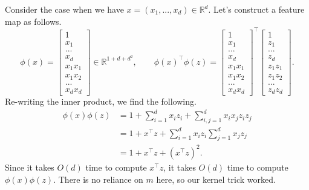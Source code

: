 
\begin{example}
Consider the case when we have $x = (x_1, ..., x_d) \in \mathbb{R}^d$. Let's construct a feature map as follows.
$$
\phi(x) = \begin{bmatrix} 1 \\ x_1 \\ ... \\ x_d \\ x_1x_1 \\ x_1x_2 \\ ... \\ x_dx_d \end{bmatrix} \in \mathbb{R}^{1 + d + d^2}, \qquad \phi(x)^\top \phi(z) = \begin{bmatrix} 1 \\ x_1 \\ ... \\ x_d \\ x_1x_1 \\ x_1x_2 \\ ... \\ x_dx_d \end{bmatrix}^\top \begin{bmatrix} 1 \\ z_1 \\ ... \\ z_d \\ z_1z_1 \\ z_1z_2 \\ ... \\ z_dz_d \end{bmatrix}.
$$
Re-writing the inner product, we find the following.
\begin{align*}
    \phi(x)\phi(z) &= 1 + \sum_{i=1}^d x_iz_i + \sum_{i, j=1}^d x_ix_jz_iz_j \\
    &= 1 + x^\top z + \sum_{i=1}^d x_iz_i \sum_{j=1}^d x_jz_j \\
    &= 1 + x^\top z + (x^\top z)^2.
\end{align*}
Since it takes $O(d)$ time to compute $x^\top z$, it takes $O(d)$ time to compute $\phi(x)\phi(z)$. There is no reliance on $m$ here, so our kernel trick worked. 
\end{example}
